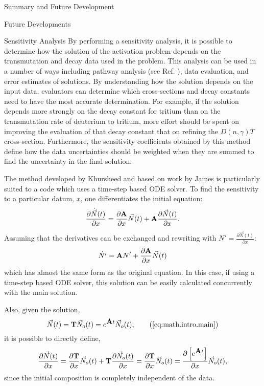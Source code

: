 \begin{chapter}{Summary and Future Development}
\begin{section}{Future Developments}
\begin{subsection}{Sensitivity Analysis}
      By performing a sensitivity analysis, it is possible to
      determine how the solution of the activation problem depends on
      the transmutation and decay data used in the
      problem\cite{sensPhD}.  This analysis can be used in a number of
      ways including pathway analysis (see Ref. ), data
      evaluation, and error estimates of solutions.  By understanding
      how the solution depends on the input data, evaluators can
      determine which cross-sections and decay constants need to have
      the most accurate determination.  For example, if the solution
      depends more strongly on the decay constant for tritium than on
      the transmutation rate of deuterium to tritium, more effort
      should be spent on improving the evaluation of that decay
      constant that on refining the $D(n,\gamma)T$ cross-section.
      Furthermore, the sensitivity coefficients obtained by this
      method define how the data uncertainties should be weighted when
      they are summed to find the uncertainty in the final solution.
    
      The method developed by Khursheed\cite{sensPhD} and based on
      work by James\cite{sensJames} is particularly suited to a
      code which uses a time-step based ODE solver.  To find the
      sensitivity to a particular datum, $x$, one differentiates the
      initial equation:
      \begin{equation*}
        \frac{\partial\dot{\vec{N}}(t)}{\partial x} =
        \frac{\partial\mbox{$\mathbf{A}$}}{\partial x}\vec{N}(t) +
        \mbox{$\mathbf{A}$}\frac{\partial\vec{N}(t)}{\partial x}.
      \end{equation*}
      Assuming that the derivatives can be exchanged and rewriting with $N'
      = \frac{\partial\vec{N}(t)}{\partial x}$:
      \begin{equation}
        \dot{N'} =  \mbox{$\mathbf{A}$}N' + \frac{\partial\mbox{$\mathbf{A}$}}{\partial x}\vec{N}(t)
      \end{equation}
      which has almost the same form as the original equation.  In
      this case, if using a time-step based ODE solver, this solution
      can be easily calculated concurrently with the main solution.
    
      Also, given the solution,
      \begin{equation}
        \vec{N}(t) = \mat{T}\vec{N}_o(t) = e^{\mat{A}t}\vec{N}_o(t),\tag{\ref{eq:math.intro.main}}
      \end{equation}
      it is possible to directly define,
      \begin{equation}
        \frac{\partial\vec{N}(t)}{\partial x} =
        \frac{\partial\mbox{$\mathbf{T}$}}{\partial x}\vec{N}_o(t) +
        \mbox{$\mathbf{T}$}\frac{\partial\vec{N}_o(t)}{\partial x} =
        \frac{\partial\mbox{$\mathbf{T}$}}{\partial x}\vec{N}_o(t) = 
        \frac{\partial \left[ e^{\mbox{$\mathbf{A}$}t}\right]}{\partial x}\vec{N}_o(t),
      \end{equation}
      since the initial composition is completely independent of the data.
      

\end{subsection}
\end{section}
\end{chapter}
